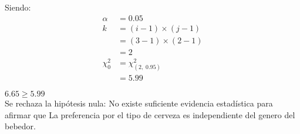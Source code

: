 \documentclass{article}
\begin{document}
Siendo:\\
\begin{align*}
\alpha &= 0.05\\
	  k&= (i-1)\times (j-1)\\
	   &=(3-1)\times(2-1)\\
	   &=2\\
\chi^2 _0 &= \chi^2_{(2,\;0.95)}\\
       &= 5.99
\end{align*}

$6.65 \ge 5.99$\\

Se rechaza la hipótesis nula: No existe suficiente evidencia estadística para afirmar que La preferencia por el tipo de cerveza es independiente del genero del bebedor.

	   
\end{document}
